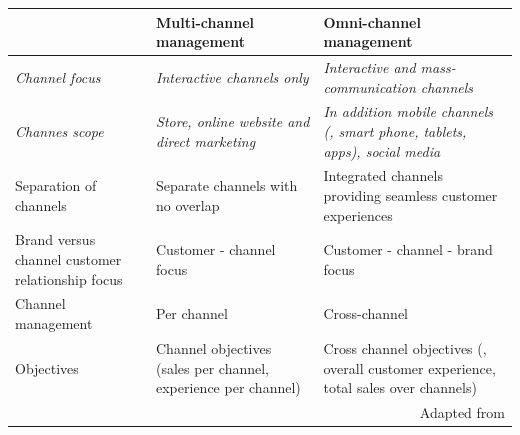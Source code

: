 		\begin{table}[caption={Multi- and omni-channel comparison}, label={tab:mcoccomparison}]
			\centering
			\begin{tabular}{p{3cm}| p{5cm} |p{5cm}} 
				& \textbf{Multi-channel management}                                   & \textbf{Omni-channel management}                                                              \\ \hline
				\textit{Channel focus}                         & \textit{Interactive channels only}                                    & \textit{Interactive and mass-communication channels}                                                   \\ \hline
				\textit{Channes scope}                                 & \textit{Store, online website and direct marketing}                          & \textit{In addition mobile channels (\ie, smart phone, tablets, apps), social media}                   \\ \hline
				{Separation of channels}                           & Separate channels with no overlap                                  & Integrated channels providing seamless customer experiences                                   \\ \hline
				{Brand versus channel customer relationship focus} & Customer - channel focus                                            & Customer - channel - brand  focus                                                              \\ \hline
				{Channel management}                               & Per channel                                                         & Cross-channel                                                                                 \\ \hline
				{Objectives}                                       & Channel objectives (\ie sales per channel, experience per channel)& Cross channel objectives (\ie, overall customer experience, total sales over channels) \\
				\multicolumn{3}{r}{Adapted from \citep[\p{176}]{vorhoef2015retail}}
			\end{tabular}
		\end{table}
